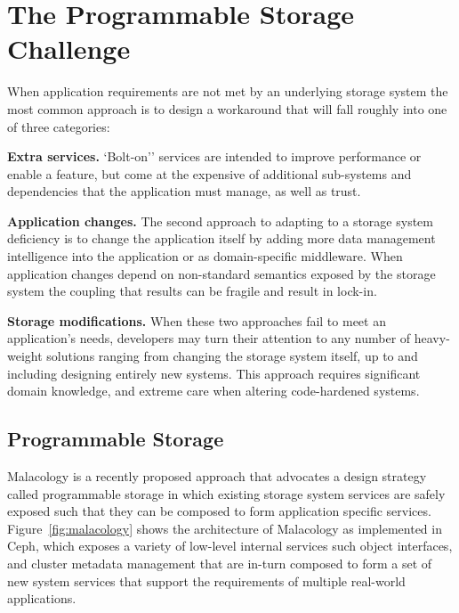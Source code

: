 \section{The Programmable Storage Challenge}
\label{sec:progly}

When application requirements are not met by an underlying storage system the
most common approach is to design a workaround that will fall roughly into one
of three categories:

{\bf Extra services.} `Bolt-on'' services are intended to improve performance
or enable a feature, but come at the expensive of additional sub-systems and
dependencies that the application must manage, as well as trust.

{\bf Application changes.} The second approach to adapting to a storage system
deficiency is to change the application itself by adding more data management
intelligence into the application or as domain-specific middleware. When
application changes depend on non-standard semantics exposed by the storage
system the coupling that results can be fragile and result in lock-in.

{\bf Storage modifications.} When these two approaches fail to meet an
application's needs, developers may turn their attention to any number of
heavy-weight solutions ranging from changing the storage system itself, up to
and including designing entirely new systems. This approach requires
significant domain knowledge, and extreme care when altering code-hardened
systems.

\subsection{Programmable Storage}

Malacology is a recently proposed approach that advocates a design strategy
called programmable storage in which existing storage system services are
safely exposed such that they can be composed to form application specific
services. Figure~\ref{fig:malacology} shows the architecture of Malacology as
implemented in Ceph, which exposes a variety of low-level internal services
such object interfaces, and cluster metadata management that are in-turn
composed to form a set of new system services that support the requirements of
multiple real-world applications.

